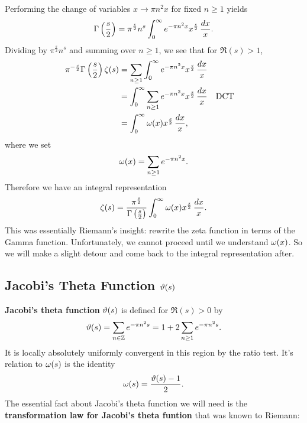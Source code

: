       Performing the change of variables $x \to \pi n^{2}x$ for fixed $n \ge 1$ yields
      \begin{equation}\label{equ:gamma_integral_substitution}
        \Gamma\left(\frac{s}{2}\right) = \pi^{\frac{s}{2}} n^{s}\int_{0}^{\infty}e^{-\pi n^{2}x}x^{\frac{s}{2}}\,\frac{dx}{x}.
      \end{equation}
      Dividing by $\pi^{\frac{s}{2}}n^{s}$ and summing over $n \ge 1$, we see that for $\Re(s) > 1$,
      \begin{align*}
        \pi^{-\frac{s}{2}}\Gamma\left(\frac{s}{2}\right)\zeta(s) &= \sum_{n \ge 1}\int_{0}^{\infty}e^{-\pi n^{2}x}x^{\frac{s}{2}}\,\frac{dx}{x} \\
        &= \int_{0}^{\infty}\sum_{n \ge 1}e^{-\pi n^{2}x}x^{\frac{s}{2}}\,\frac{dx}{x} && \text{DCT} \\
        &= \int_{0}^{\infty}\omega(x)x^{\frac{s}{2}}\,\frac{dx}{x},
      \end{align*}
      where we set
      \[
        \omega(x) = \sum_{n \ge 1}e^{-\pi n^{2}x}.
      \]
      Therefore we have an integral representation
      \begin{equation}\label{equ:integral_representation_zeta_1}
        \zeta(s) = \frac{\pi^{\frac{s}{2}}}{\Gamma\left(\frac{s}{2}\right)}\int_{0}^{\infty}\omega(x)x^{\frac{s}{2}}\,\frac{dx}{x}.
      \end{equation}
      This was essentially Riemann's insight: rewrite the zeta function in terms of the Gamma function. Unfortunately, we cannot proceed until we understand $\omega(x)$. So we will make a slight detour and come back to the integral representation after.
    \subsection*{Jacobi's Theta Function \texorpdfstring{$\vartheta(s)$}{\vt(s)}}
      \textbf{Jacobi's theta function} $\vartheta(s)$ is defined for $\Re(s) > 0$ by
      \[
        \vartheta(s) = \sum_{n \in \mathbb{Z}}e^{-\pi n^{2}s} = 1+2\sum_{n \ge 1}e^{-\pi n^{2}s}.
      \]
      It is locally absolutely uniformly convergent in this region by the ratio test. It's relation to $\omega(s)$ is the identity
      \begin{equation}\label{equ:omega_theta_relationship_for_zeta}
        \omega(s) = \frac{\vartheta(s)-1}{2}.
      \end{equation}
      The essential fact about Jacobi's theta function we will need is the \textbf{transformation law for Jacobi's theta funtion} that was known to Riemann:

